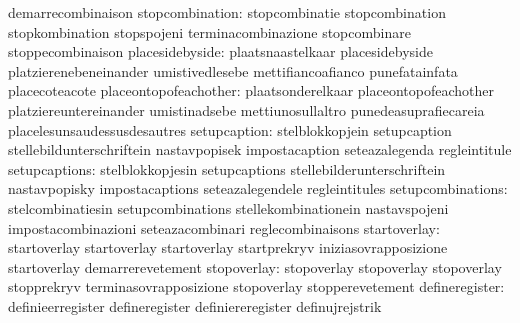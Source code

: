                                  demarrecombinaison
                 stopcombination: stopcombinatie                   stopcombination
                                  stopkombination                  stopspojeni
                                  terminacombinazione              stopcombinare
                                  stoppecombinaison
                 placesidebyside: plaatsnaastelkaar                placesidebyside
                                  platzierenebeneinander           umistivedlesebe
                                  mettifiancoafianco               punefatainfata
                                  placecoteacote
           placeontopofeachother: plaatsonderelkaar                placeontopofeachother
                                  platziereuntereinander           umistinadsebe
                                  mettiunosullaltro                punedeasuprafiecareia
                                  placelesunsaudessusdesautres
                    setupcaption: stelblokkopjein                  setupcaption
                                  stellebildunterschriftein        nastavpopisek
                                  impostacaption                   seteazalegenda
                                  regleintitule
                   setupcaptions: stelblokkopjesin                 setupcaptions
                                  stellebilderunterschriftein      nastavpopisky
                                  impostacaptions                  seteazalegendele
                                  regleintitules
               setupcombinations: stelcombinatiesin                setupcombinations
                                  stellekombinationein             nastavspojeni
                                  impostacombinazioni              seteazacombinari
                                  reglecombinaisons
                    startoverlay: startoverlay                     startoverlay
                                  startoverlay                     startprekryv
                                  iniziasovrapposizione            startoverlay
                                  demarrerevetement
                     stopoverlay: stopoverlay                      stopoverlay
                                  stopoverlay                      stopprekryv
                                  terminasovrapposizione           stopoverlay
                                  stopperevetement
                  defineregister: definieerregister                defineregister
                                  definiereregister                definujrejstrik
